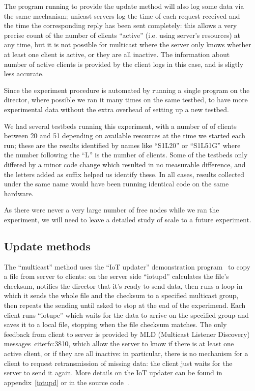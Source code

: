 \documentclass[a4paper,11pt,twocolumn]{article}
\begin{document}
The program running to provide the update method will also log some
data via the same mechanism; unicast servers log the time of each
request received and the time the corresponding reply has been
sent completely: this allows a very precise count of the number of
clients ``active'' (i.e. using server's resources) at any time, but
it is not possible for multicast where the server only knows whether
at least one client is active, or they are all inactive. The information
about number of active clients is provided by the client logs in this
case, and is sligtly less accurate.

Since the experiment procedure is automated by running a single program
on the director, where possible we ran it many times on the same
testbed, to have more experimental data without the extra overhead
of setting up a new testbed.

We had several testbeds running this experiment, with a number of
of clients between 20 and 51 depending on available resources at
the time we started each run; these are the results identified
by names like ``S1L20'' or ``S1L51G'' where the number following
the ``L'' is the number of clients. Some of the testbeds only differed
by a minor code change which resulted in no measurable difference,
and the letters added as suffix helped us identify these.  In all
cases, results collected under the same name would have been running
identical code on the same hardware.

As there were never a very large number of free nodes while we ran
the experiment, we will need to leave a detailed study of scale to
a future experiment.

\subsection{Update methods}
The ``multicast'' method uses the ``IoT updater'' demonstration
program~\cite{iotupd:paper} to copy a file from server to clients: on
the server side ``iotupd'' calculates the file's checksum, notifies the
director that it's ready to send data, then runs a loop in which it sends
the whole file and the checksum to a specified multicast group, then
repeats the sending until asked to stop at the end of the experimend.
Each client runs ``iotupc'' which waits for the data to arrive on the
specified group and saves it to a local file, stopping when the file
checksum matches.  The only feedback from client to server is provided by
MLD (Multicast Listener Discovery) messages~cite{rfc:3810}, which allow
the server to know if there is at least one active client, or if they
are all inactive: in particular, there is no mechanism for a client to
request retransmission of missing data: the client just waits for the
server to send it again. More details on the IoT updater can be found
in appendix~\ref{iotupd} or in the source code~\cite{iotupd:sources}.
\end{document}
